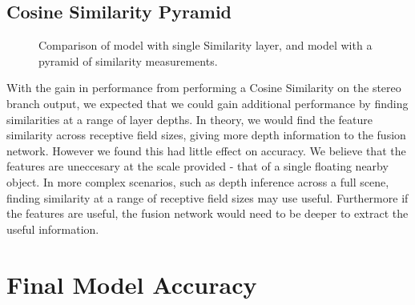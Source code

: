 \documentclass[ %
                    author={Gavin Parker},
                supervisor={Dr. Neill Campbell},
                    degree={MEng},
                     title={Deep Siamese Networks for Illumination Estimation from Stereo Images},
                  subtitle={},
                      type={Research},
                      year={2018} ]{dissertation}
\begin{document}
\subsection{Cosine Similarity Pyramid}
\begin{figure}[H]
\setlength\figureheight{6cm}
\setlength\figurewidth{12cm}
\centering

\caption{Comparison of model with single Similarity layer, and model with a pyramid of similarity measurements.}
\end{figure}
With the gain in performance from performing a Cosine Similarity on the stereo branch output, we expected that we could gain additional performance by finding similarities at a range of layer depths. In theory, we would find the feature similarity across receptive field sizes, giving more depth information to the fusion network. However we found this had little effect on accuracy. We believe that the features are uneccesary at the scale provided - that of a single floating nearby object. In more complex scenarios, such as depth inference across a full scene, finding similarity at a range of receptive field sizes may use useful. Furthermore if the features are useful, the fusion network would need to be deeper to extract the useful information.
\section{Final Model Accuracy}
\end{document}
